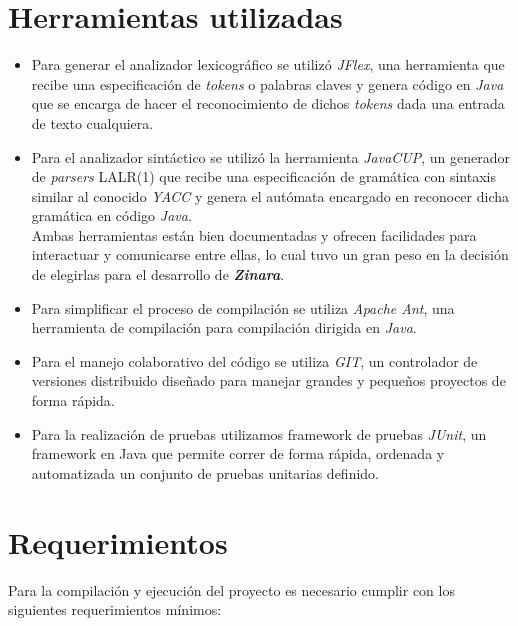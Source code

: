 \documentclass[12pt, spanish]{report}
\begin{document}
\section{Herramientas utilizadas}
\label{sec:herramientas}

\begin{itemize}
\item Para generar el analizador lexicogr\'afico se utiliz\'o
  \emph{JFlex}\cite{jflex}, una herramienta que recibe una
  especificaci\'on de \emph{tokens} o palabras claves y genera c\'odigo en
  \emph{Java} que se encarga de hacer el reconocimiento de dichos
  \emph{tokens} dada una entrada de texto cualquiera.

\item Para el analizador sint\'actico se utiliz\'o la herramienta
  \emph{JavaCUP}\cite{javacup}, un generador de \emph{parsers} LALR(1)
  que recibe una especificaci\'on de gram\'atica con sintaxis similar
  al conocido \emph{YACC} y genera el aut\'omata encargado en
  reconocer dicha gram\'atica en c\'odigo \emph{Java}.\\

  Ambas herramientas est\'an bien documentadas y ofrecen facilidades
  para interactuar y comunicarse entre ellas, lo cual tuvo un gran
  peso en la decisi\'on de elegirlas para el desarrollo de
  \emph{\textbf{Zinara}}.

\item Para simplificar el proceso de compilaci\'on se utiliza
  \emph{Apache Ant}\cite{ant}, una herramienta de compilaci\'on para
  compilaci\'on dirigida en \emph{Java}.

\item Para el manejo colaborativo del c\'odigo se utiliza
  \emph{GIT}\cite{git}, un controlador de versiones distribuido
  dise\~nado para manejar grandes y peque\~nos proyectos de forma
  r\'apida.

\item Para la realizaci\'on de pruebas utilizamos framework de pruebas
  \emph{JUnit}, un framework en Java que permite correr de forma
  r\'apida, ordenada y automatizada un conjunto de pruebas unitarias
  definido.
\end{itemize}

\section{Requerimientos}
\label{sec:requ}

Para la compilaci\'on y ejecuci\'on del proyecto es necesario cumplir con
los siguientes requerimientos m\'inimos:
\end{document}
